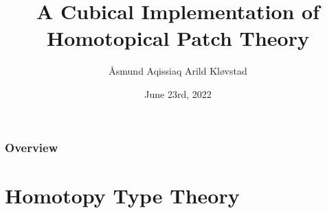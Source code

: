 \documentclass{beamer}
\title[A Cubical Implementation of Homotopical Patch Theory]{A Cubical Implementation of Homotopical Patch Theory} %
\author{Åsmund Aqissiaq Arild Kløvstad} %
\institute[UiB] %
{
Universitetet i Bergen \\ %
}
\date{June 23rd, 2022} %
\begin{document}
\begin{frame}
\titlepage %
\end{frame}

\begin{frame}
\frametitle{Overview} %
\tableofcontents %
\end{frame}


\section{Homotopy Type Theory}


  
\end{document}
